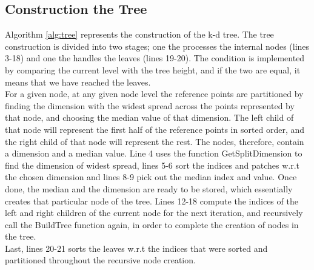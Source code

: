 \subsection{Construction the Tree}

Algorithm \ref{alg:tree} represents the construction of the k-d tree. The tree construction is divided into two stages; one the processes the internal nodes (lines 3-18) and one the handles the leaves (lines 19-20). 
The condition is implemented by comparing the current level with the tree height, and if the two are equal, it means that we have reached the leaves. 
\\[2mm]
For a given node, at any given node level the reference points are partitioned by finding the dimension with the widest spread across the points represented by that node, and choosing the median value of that dimension. The left child of that node will represent the first half of the reference points in sorted order, and the right child of that node will represent the rest. 
The nodes, therefore, contain a dimension and a median value. Line 4 uses the function GetSplitDimension to find the dimension of widest spread, lines 5-6 sort the indices and patches w.r.t the chosen dimension and lines 8-9 pick out the median index and value. Once done, the median and the dimension are ready to be stored, which essentially creates that particular node of the tree. Lines 12-18 compute the indices of the left and right children of the current node for the next iteration, and recursively call the BuildTree function again, in order to complete the creation of nodes in the tree. 
\\[2mm]
Last, lines 20-21 sorts the leaves w.r.t the indices that were sorted and partitioned throughout the recursive node creation.


